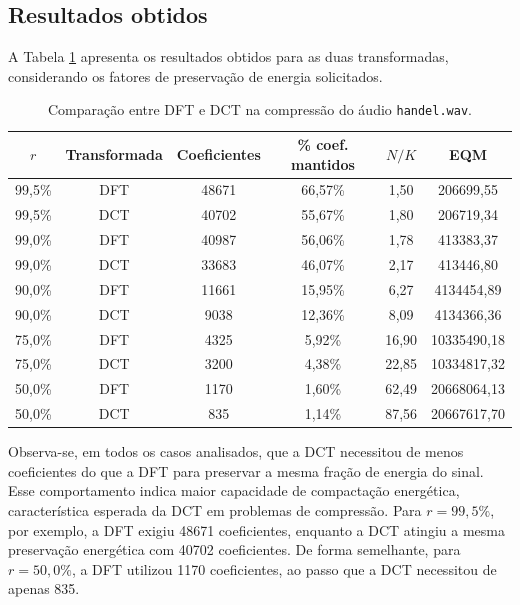 \documentclass[12pt,a4paper]{article}
\begin{document}
\subsection{Resultados obtidos}

A Tabela \ref{tab:q3_resultados} apresenta os resultados obtidos para as duas transformadas, considerando os fatores de preservação de energia solicitados.

\begin{table}[H]
    \centering
    \caption{Comparação entre DFT e DCT na compressão do áudio \texttt{handel.wav}.}
    \label{tab:q3_resultados}
    \begin{tabular}{cccccc}
        \toprule
        \(r\) & Transformada & Coeficientes & \% coef. mantidos & \(N/K\) & EQM \\
        \midrule
        99,5\% & DFT & 48671 & 66,57\% & 1,50 & 206699,55 \\
        99,5\% & DCT & 40702 & 55,67\% & 1,80 & 206719,34 \\
        \midrule
        99,0\% & DFT & 40987 & 56,06\% & 1,78 & 413383,37 \\
        99,0\% & DCT & 33683 & 46,07\% & 2,17 & 413446,80 \\
        \midrule
        90,0\% & DFT & 11661 & 15,95\% & 6,27 & 4134454,89 \\
        90,0\% & DCT & 9038 & 12,36\% & 8,09 & 4134366,36 \\
        \midrule
        75,0\% & DFT & 4325 & 5,92\% & 16,90 & 10335490,18 \\
        75,0\% & DCT & 3200 & 4,38\% & 22,85 & 10334817,32 \\
        \midrule
        50,0\% & DFT & 1170 & 1,60\% & 62,49 & 20668064,13 \\
        50,0\% & DCT & 835 & 1,14\% & 87,56 & 20667617,70 \\
        \bottomrule
    \end{tabular}
\end{table}

Observa-se, em todos os casos analisados, que a DCT necessitou de menos coeficientes do que a DFT para preservar a mesma fração de energia do sinal. Esse comportamento indica maior capacidade de compactação energética, característica esperada da DCT em problemas de compressão. Para \(r=99{,}5\%\), por exemplo, a DFT exigiu 48671 coeficientes, enquanto a DCT atingiu a mesma preservação energética com 40702 coeficientes. De forma semelhante, para \(r=50{,}0\%\), a DFT utilizou 1170 coeficientes, ao passo que a DCT necessitou de apenas 835.
\end{document}
